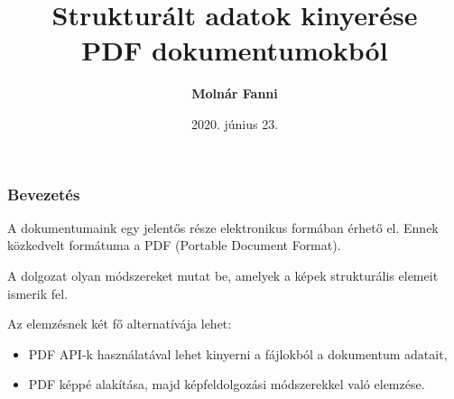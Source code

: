\documentclass{beamer}
\begin{document}

\title[Strukturált adatok kinyerése PDF dokumentumokból]{Strukturált adatok kinyerése \\ PDF dokumentumokból}
\author[Molnár Fanni]{\textbf{Molnár Fanni}}
\date{2020. június 23.}

\frame{\titlepage}

\begin{frame}[fragile]
\frametitle{Bevezetés}

A dokumentumaink egy jelentős része elektronikus formában érhető el. Ennek közkedvelt formátuma a PDF (Portable Document Format).

\bigskip

A dolgozat olyan módszereket mutat be, amelyek a képek strukturális elemeit ismerik fel.

\bigskip

Az elemzésnek két fő alternatívája lehet:
\begin{itemize}
    \item PDF API-k használatával lehet kinyerni a fájlokból a dokumentum adatait,
    \item PDF képpé alakítása, majd képfeldolgozási módszerekkel való elemzése.
\end{itemize}

\end{frame}
\end{document}
